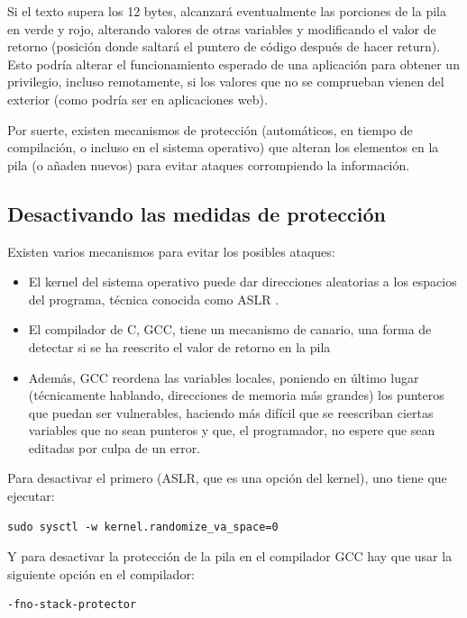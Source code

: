 \documentclass[]{article}
\begin{document}
Si el texto supera los 12 bytes, alcanzará eventualmente las porciones de la pila en verde y rojo, alterando valores de otras variables y modificando el valor de retorno (posición donde saltará el puntero de código después de hacer return). Esto podría alterar el funcionamiento esperado de una aplicación para obtener un privilegio, incluso remotamente, si los valores que no se comprueban vienen del exterior (como podría ser en aplicaciones web).

Por suerte, existen mecanismos de protección (automáticos, en tiempo de compilación, o incluso en el sistema operativo) que alteran los elementos en la pila (o añaden nuevos) para evitar ataques corrompiendo la información.

\subsection{Desactivando las medidas de protección}

Existen varios mecanismos para evitar los posibles ataques:

\begin{itemize}
	\item El kernel del sistema operativo puede dar direcciones aleatorias a los espacios del programa, técnica conocida como ASLR \cite{ASLR}.
	\item El compilador de C, GCC, tiene un mecanismo de canario, una forma de detectar si se ha reescrito el valor de retorno en la pila \cite{bocanary}
	\item Además, GCC reordena las variables locales, poniendo en último lugar (técnicamente hablando, direcciones de memoria más grandes) los punteros que puedan ser vulnerables, haciendo más difícil que se reescriban ciertas variables que no sean punteros y que, el programador, no espere que sean editadas por culpa de un error.
\end{itemize}

Para desactivar el primero (ASLR, que es una opción del kernel), uno tiene que ejecutar:

\begin{verbatim}
sudo sysctl -w kernel.randomize_va_space=0
\end{verbatim}


Y para desactivar la protección de la pila en el compilador GCC hay que usar la siguiente opción en el compilador:

\begin{verbatim}
-fno-stack-protector
\end{verbatim}
\end{document}
